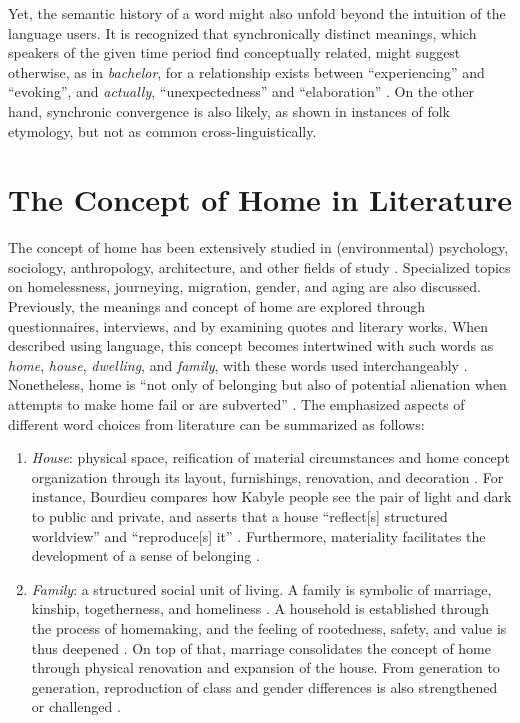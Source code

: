 Yet, the semantic history of a word might also unfold beyond the intuition of the language users.  It is recognized that synchronically distinct meanings, which speakers of the given time period find conceptually related, might suggest otherwise, as in \textit{bachelor}, for a relationship exists between ``experiencing'' and ``evoking'', and \textit{actually}, ``unexpectedness'' and ``elaboration'' \parencite[13]{traugott2001regularity}. On the other hand, synchronic convergence is also likely, as shown in instances of folk etymology, but not as common cross­-linguistically.

\section{The Concept of Home in Literature}
The concept of home has been extensively studied in (environmental) psychology, sociology, anthropology, architecture, and other fields of study \parencite{samanani2019house,mallett2004understanding,moore2000placing,sixsmith1986meaning}. Specialized topics on homelessness, journeying, migration, gender, and aging are also discussed. Previously, the meanings and concept of home are explored through questionnaires, interviews, and by examining quotes and literary works. When described using language, this concept becomes intertwined with such words as \textit{home}, \textit{house}, \textit{dwelling}, and \textit{family}, with these words used interchangeably \parencite{mallett2004understanding,sixsmith1986meaning}. Nonetheless, home is ``not only of belonging but also of potential alienation when attempts to make home fail or are subverted'' \parencite{samanani2019house}. The emphasized aspects of different word choices from literature can be summarized as follows: 

\begin{enumerate}
    \item \textit{House}: physical space, reification of material circumstances and home concept organization through its layout, furnishings, renovation, and decoration \parencite{samanani2019house}. For instance, Bourdieu compares how Kabyle people see the pair of light and dark to public and private, and asserts that a house ``reflect[s] structured worldview'' and ``reproduce[s] it'' \parencite{samanani2019house}. Furthermore, materiality facilitates the development of a sense of belonging \parencite{moore2000placing}.
    \item \textit{Family}: a structured social unit of living. A family is symbolic of marriage, kinship, togetherness, and homeliness \parencite{samanani2019house}. A household is established through the process of homemaking, and the feeling of rootedness, safety, and value is thus deepened \parencite{samanani2019house,moore2000placing}. On top of that, marriage consolidates the concept of home through physical renovation and expansion of the house. From generation to generation, reproduction of class and gender differences is also strengthened or challenged \parencite{samanani2019house,mallett2004understanding}.
\end{enumerate}

